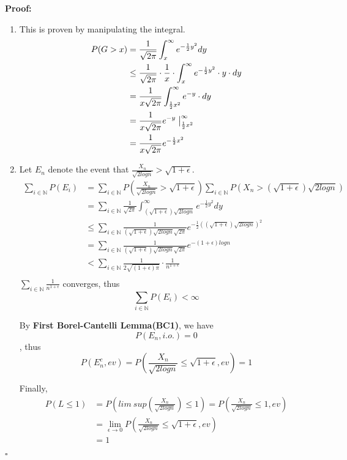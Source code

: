 \documentclass[UTF8, 12pt]{article}
\newenvironment{proof}{\noindent\ignorespaces\textbf{Proof:}}{\hfill $\square$\par\noindent}
\theoremstyle{break}
\begin{document}
    \begin{proof}
        \begin{enumerate}
            \item This is proven by manipulating the integral.
            \begin{align*}
                P(G > x) &= \frac{1}{\sqrt{2\pi}}\int_{x}^{\infty}e^{-\frac{1}{2}y^2}dy \\
                &\leq \frac{1}{\sqrt{2\pi}} \cdot \frac{1}{x} \cdot \int_{x}^{\infty}e^{-\frac{1}{2}y^2}\cdot y \cdot dy \\
                &= \frac{1}{x\sqrt{2\pi}} \int_{\frac{1}{2}x^2}^{\infty}e^{-y}\cdot dy \\
                &= \frac{1}{x\sqrt{2\pi}} e^{-y}\bigm|^{\infty}_{\frac{1}{2}x^2} \\
                &= \frac{1}{x\sqrt{2\pi}}e^{-\frac{1}{2}x^2}
            \end{align*}

            \item Let $E_n$ denote the event that $\frac{X_n}{\sqrt{2logn}} > \sqrt{1 + \epsilon}$.
            \begin{align*}
                \sum_{i \in \mathbb{N}} P(E_i) &= \sum_{i \in \mathbb{N}} P(\frac{X_n}{\sqrt{2logn}} > \sqrt{1 + \epsilon}) \sum_{i \in \mathbb{N}} P(X_n > (\sqrt{1 + \epsilon})\sqrt{2logn})\\
                &= \sum_{i \in \mathbb{N}} \frac{1}{\sqrt{2\pi}}\int_{ (\sqrt{1 + \epsilon})\sqrt{2logn} }^{\infty}e^{-\frac{1}{2}y^2}dy \\
                &\leq \sum_{i \in \mathbb{N}} \frac{1}{ (\sqrt{1 + \epsilon})\sqrt{2logn} \sqrt{2\pi}} e^{-\frac{1}{2}((\sqrt{1 + \epsilon})\sqrt{2logn})^2} \\
                &= \sum_{i \in \mathbb{N}} \frac{1}{ (\sqrt{1 + \epsilon})\sqrt{2logn} \sqrt{2\pi}} e^{-(1 + \epsilon)logn} \\
                &< \sum_{i \in \mathbb{N}} \frac{1}{ 2\sqrt{(1 + \epsilon)\pi}} \cdot \frac{1}{n ^ {1 + \epsilon}} \\
            \end{align*}
            $\sum_{i \in \mathbb{N}} \frac{1}{n ^ {1 + \epsilon}}$ converges, thus $$  \sum_{i \in \mathbb{N}} P(E_i) < \infty $$

            By \textbf{First Borel-Cantelli Lemma(BC1)}, we have $$ P(E_n, i.o.) = 0 $$ ,
            thus $$ P(E_n^c,ev) = P(\frac{X_n}{\sqrt{2logn}} \leq \sqrt{1 + \epsilon}, ev) = 1 $$
            
            Finally,
            \begin{align*}
                P(L \leq 1) &= P( lim\ sup(\frac{X_n}{\sqrt{2logn}}) \leq 1) = P(\frac{X_n}{\sqrt{2logn}} \leq 1, ev) \\
                &= \lim_{\epsilon\to 0} P(\frac{X_n}{\sqrt{2logn}} \leq \sqrt{1 + \epsilon}, ev) \\
                &= 1
            \end{align*}
        \end{enumerate}
    \end{proof}
\end{document}
